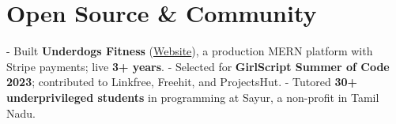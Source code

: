 \documentclass[letterpaper,11pt]{article}
\newcommand{\inlineBlock}[1]{{\setlength{\leftskip}{0.18in}\small #1\par}}
\begin{document}
\section{Open Source \& Community}
\inlineBlock{- Built \textbf{Underdogs Fitness} (\href{https://www.underdogsfitness.in/}{Website}), a production MERN platform with Stripe payments; live \textbf{3+ years}. - Selected for \textbf{GirlScript Summer of Code 2023}; contributed to Linkfree, Freehit, and ProjectsHut. - Tutored \textbf{30+ underprivileged students} in programming at Sayur, a non-profit in Tamil Nadu.}
\end{document}

